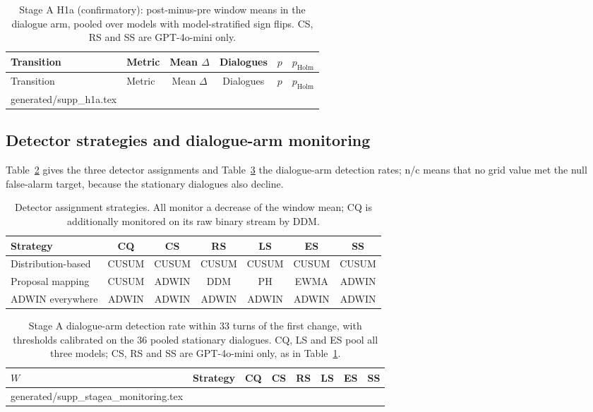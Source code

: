 \documentclass[10pt]{article}
\makeatletter
\newcommand{\inputtable}[1]{\@@input #1 }
\makeatother
\begin{document}
\begin{longtable}{llcccc}
\caption{Stage A H1a (confirmatory): post-minus-pre window means in the
dialogue arm, pooled over models with model-stratified sign flips. CS, RS and
SS are GPT-4o-mini only.}
\label{tab:h1a}\\
\toprule Transition & Metric & Mean $\Delta$ & Dialogues & $p$ & $p_{\text{Holm}}$\\\midrule
\endfirsthead
\toprule Transition & Metric & Mean $\Delta$ & Dialogues & $p$ & $p_{\text{Holm}}$\\\midrule
\endhead
\inputtable{generated/supp_h1a.tex}
\bottomrule
\end{longtable}

\subsection{Detector strategies and dialogue-arm monitoring}
Table~\ref{tab:strategies} gives the three detector assignments and
Table~\ref{tab:stagea} the dialogue-arm detection rates; n/c means that no grid
value met the null false-alarm target, because the stationary dialogues also
decline.

\begin{table}[h]\centering\small
\caption{Detector assignment strategies. All monitor a decrease of the window
mean; CQ is additionally monitored on its raw binary stream by DDM.}
\label{tab:strategies}
\begin{tabular}{lcccccc}\toprule
Strategy & CQ & CS & RS & LS & ES & SS\\\midrule
Distribution-based & CUSUM & CUSUM & CUSUM & CUSUM & CUSUM & CUSUM\\
Proposal mapping & CUSUM & ADWIN & DDM & PH & EWMA & ADWIN\\
ADWIN everywhere & ADWIN & ADWIN & ADWIN & ADWIN & ADWIN & ADWIN\\
\bottomrule\end{tabular}\end{table}

\begin{table}[h]\centering\small
\caption{Stage A dialogue-arm detection rate within 33 turns of the first
change, with thresholds calibrated on the 36 pooled stationary dialogues. CQ,
LS and ES pool all three models; CS, RS and SS are GPT-4o-mini only, as in
Table~\ref{tab:h1a}.}
\label{tab:stagea}
\begin{tabular}{llcccccc}\toprule
$W$ & Strategy & CQ & CS & RS & LS & ES & SS\\\midrule
\inputtable{generated/supp_stagea_monitoring.tex}
\bottomrule\end{tabular}\end{table}
\end{document}
